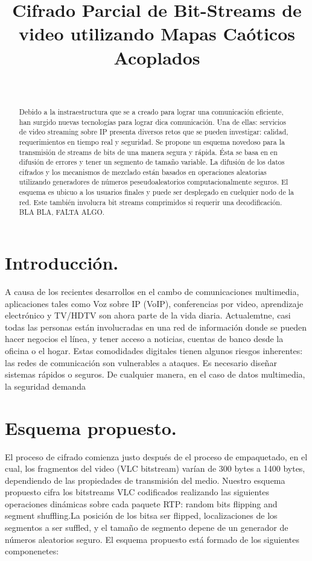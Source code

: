 \documentclass[10pt]{IEEEtran}
\title {Cifrado Parcial de Bit-Streams de video utilizando Mapas Caóticos Acoplados}
\author{\IEEEauthorblockN{Marcos Daniel Calderón Calderón}\\
\IEEEauthorblockA{Maestría en Ciencias de la Computación\\
Centro de Investigación en Matemáticas (CIMAT)\\
Guanajuato , Gto.\\
marcos.calderon@cimat.mx}}
\begin{document}
\maketitle
\begin{abstract}
Debido a la instraestructura que se a creado para lograr una comunicación eficiente, han surgido nuevas tecnologías para lograr dica comunicación. Una de ellas: servicios de video streaming sobre IP presenta diversos retos que se pueden investigar: calidad, requerimientos en tiempo real y seguridad. Se propone un esquema novedoso para la transmisión de streams de bits de una manera segura y rápida. Ésta se basa en en difusión de errores y tener un segmento de tamaño variable. La difusión de los datos cifrados y  los mecanismos de mezclado están basados en operaciones aleatorias utilizando  generadores de números peseudoaleatorios computacionalmente seguros. El esquema es ubicuo a los usuarios finales y puede ser desplegado en cuelquier nodo de la red. Este también involucra bit streams comprimidos si requerir una decodificación. BLA BLA, FALTA ALGO.
\end{abstract}
\section{Introducción.}
A causa de los recientes desarrollos en el cambo de comunicaciones multimedia, aplicaciones tales como Voz sobre IP (VoIP), conferencias por video, aprendizaje electrónico y TV/HDTV son ahora parte de la vida diaria. Actualemtne, casi todas las personas están involucradas en una red de información donde se pueden hacer negocios el línea, y tener acceso a noticias, cuentas de banco desde la oficina o el hogar. Estas comodidades digitales tienen algunos riesgos inherentes: las redes de comunicación son vulnerables a ataques. Es necesario diseñar sistemas rápidos o seguros. De cualquier manera, en el caso de datos multimedia, la seguridad demanda 

\section{Esquema propuesto.}
El proceso de cifrado comienza justo después de el proceso de empaquetado, en el cual, los fragmentos del video (VLC bitstream) varían de 300 bytes a 1400 bytes, dependiendo de las propiedades de transmisión del medio. Nuestro esquema propuesto cifra los bitstreams VLC codificados realizando las siguientes operaciones dinámicas sobre cada paquete RTP: random bits flipping and segment shuffling.La posición de los bitsa ser flipped, localizaciones de los segmentos a ser suffled, y el tamaño de segmento depene de un generador de números aleatorios seguro. El esquema propuesto está formado de los siguientes componenetes:
\end{document}
